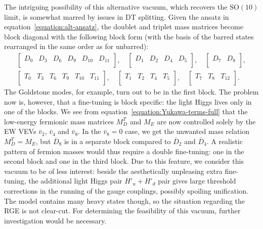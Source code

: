 \documentclass[a4paper,12pt]{article}
\def\SO{\mathrm{SO}}
\begin{document}
The intriguing possibility of this alternative vacuum, which recovers the $\SO(10)$ limit, is somewhat marred by issues in DT splitting. Given the ansatz in equation~\eqref{equation:alt-ansatz}, the doublet and triplet mass matrices become block diagonal with the following block form (with the basis of the barred states rearranged in the same order as for unbarred):
\begin{align}
\begin{bmatrix}D_0 &D_3 &D_6 &D_9 &D_{10} &D_{11}\\\end{bmatrix},\quad \begin{bmatrix}D_1 &D_2 &D_4 &D_5\\\end{bmatrix},\quad \begin{bmatrix}D_7 &D_8\\\end{bmatrix},\\
\begin{bmatrix}T_0 &T_3 &T_6 &T_9 &T_{10} &T_{11}\\\end{bmatrix},\quad \begin{bmatrix}T_1 &T_2 &T_4 &T_5\\\end{bmatrix},\quad \begin{bmatrix}T_7 &T_8& T_{12}\\\end{bmatrix}.
\end{align}
The Goldstone modes, for example, turn out to be in the first block. The problem now is, however, that a fine-tuning is block specific: the light Higgs lives only in one of the blocks. We see from equation~\eqref{equation:Yukawa-terms-full} that the low-energy fermionic mass matrices $M_D^T$ and $M_E$ are now controlled solely by the EW VEVs $\bar{v}_2$, $\bar{v}_4$ and $\bar{v}_8$. In the $\bar{v}_8=0$ case, we get the unwanted mass relation $M_D^T=M_E$, but $\overline{D}_{8}$ is in a separate block compared to $\overline{D}_2$ and $\overline{D}_4$. A realistic pattern of fermion masses would thus require a double fine-tuning: one in the second block and one in the third block. Due to this feature, we consider this vacuum to be of less interest: beside the aesthetically unpleasing extra fine-tuning, the additional light Higgs pair $H'_u+H'_d$ pair gives large threshold corrections in the running of the gauge couplings, possibly spoiling unification. The model contains many heavy states though, so the situation regarding the RGE is not clear-cut. For determining the feasibility of this vacuum, further investigation would be necessary.
\end{document}
